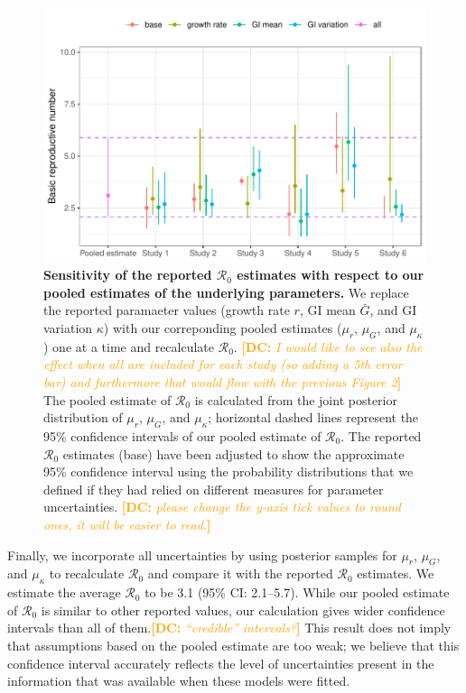 \documentclass[12pt]{article}
\newcommand{\comment}[3]{\textcolor{#1}{\textbf{[#2: }\textsl{#3}\textbf{]}}}
\newcommand{\dc}[1]{\comment{Orange}{DC}{#1}}
\begin{document}
\begin{figure}[!th]
\includegraphics[width=\textwidth]{compare_R0.pdf}
\caption{
\textbf{Sensitivity of the reported $\mathcal R_0$ estimates with respect to our pooled estimates of the underlying parameters.}
We replace the reported paramaeter values (growth rate $r$, GI mean $\bar G$, and GI variation $\kappa$) with our correponding pooled estimates ($\mu_r$, $\mu_G$, and $\mu_\kappa$) one at a time and recalculate $\mathcal R_0$.
\dc{I would like to see also the effect when all are included for each study (so adding a 5th error bar) and furthermore that would flow with the previous Figure 2}
The pooled estimate of $\mathcal R_0$ is calculated from the joint posterior distribution of $\mu_r$, $\mu_G$, and $\mu_\kappa$;
horizontal dashed lines represent the 95\% confidence intervals of our pooled estimate of $\mathcal R_0$.
The reported $\mathcal R_0$ estimates (base) have been adjusted to show the approximate 95\% confidence interval using the probability distributions that we defined if they had relied on different measures for parameter uncertainties.
\dc{please change the y-axis tick values to round ones, it will be easier to read.}
}
\label{fig:R0}
\end{figure}

Finally, we incorporate all uncertainties by using posterior samples for $\mu_r$, $\mu_G$, and $\mu_\kappa$ to recalculate $\mathcal R_0$ and compare it with the reported $\mathcal R_0$ estimates.
We estimate the average $\mathcal R_0$ to be 3.1 (95\% CI: 2.1--5.7).
While our pooled estimate of $\mathcal R_0$ is similar to other reported values, our calculation gives wider confidence intervals than all of them.\dc{``credible'' intervals?}
This result does not imply that assumptions based on the pooled estimate are too weak;
we believe that this confidence interval accurately reflects the level of uncertainties present in the information that was available when these models were fitted.
\end{document}
